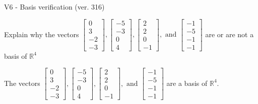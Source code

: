 \begin{exercise}
  \begin{exerciseTitle}V6 - Basis verification (ver. 316)\end{exerciseTitle}
  \begin{exerciseStatement}
    Explain why the vectors \(\left[\begin{array}{r}
0 \\
3 \\
-2 \\
-3
\end{array}\right] , \left[\begin{array}{r}
-5 \\
-3 \\
0 \\
4
\end{array}\right] , \left[\begin{array}{r}
2 \\
2 \\
0 \\
-1
\end{array}\right] , \text{ and } \left[\begin{array}{r}
-1 \\
-5 \\
-1 \\
-1
\end{array}\right]\) are or are not a basis of \(\mathbb{R}^4\)	


  \end{exerciseStatement}
  \begin{exerciseAnswer}
   The vectors \(\left[\begin{array}{r}
0 \\
3 \\
-2 \\
-3
\end{array}\right] , \left[\begin{array}{r}
-5 \\
-3 \\
0 \\
4
\end{array}\right] , \left[\begin{array}{r}
2 \\
2 \\
0 \\
-1
\end{array}\right] , \text{ and } \left[\begin{array}{r}
-1 \\
-5 \\
-1 \\
-1
\end{array}\right]\) 
  	 are  a basis of \(\mathbb{R}^4\).
  


  \end{exerciseAnswer}
\end{exercise}